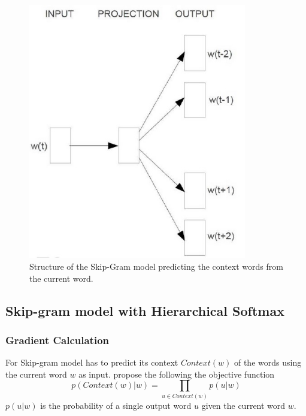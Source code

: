 \begin{center}
\begin{figure}[tb]
\begin{minipage}{.49\textwidth}
	\includegraphics[width=0.85\textwidth]{Skip-Gram}
	\caption{Structure of the Skip-Gram model predicting the context words from the current word. }
	\label{fig:Skip-Gram}
\end{minipage}
\end{figure}
\end{center}


\subsection{Skip-gram model with Hierarchical Softmax}

\subsubsection {Gradient Calculation} 
For Skip-gram model has to predict  its context $Context(w)$ of the words using the current word $w$ as input. \cite{MikolovSutskeverEtAl2013} propose the following the objective function 
\begin{equation}
p(Context(w)|w)=\prod_{u\in Context(w)}p(u|w)
\end{equation}
$p(u|w)$ is the probability of a single output word $u$ given the current word $w$.

